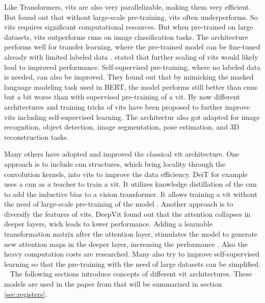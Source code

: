 \documentclass[conference]{IEEEtran}
\begin{document}
  Like Transformers, \acp{vit} are also very parallelizable, making them very efficient. But \citeauthor{visiontransformers2021} \cite{visiontransformers2021} found out that without large-scale pre-training, \acp{vit} often underperforms. So \acp{vit} requires significant computational resources. But when pre-trained on large datasets, \acp{vit} outperforms \acp{cnn} on image classification tasks. The architecture performs well for transfer learning, where the pre-trained model can be fine-tuned already with limited labeled data \cite{visiontransformers2021}. \citeauthor{visiontransformers2021} \cite{visiontransformers2021} stated that further scaling of \acp{vit} would likely lead to improved performance. Self-supervised pre-training, where no labeled data is needed, can also be improved. They found out that by mimicking the masked language modeling task used in BERT, the model performs still better than \acp{cnn} but a bit worse than with supervised pre-training of a \ac{vit}. By now different architectures and training tricks of \acp{vit} have been proposed to further improve \acp{vit} including self-supervised learning. The architectur also got adapted for image recognition, object detection, image segmentation, pose estimation, and 3D reconstruction tasks. \cite{vit-state-challenges}

  Many others have adopted and improved the classical \ac{vit} architecture. One approach is to include \ac{cnn} structures, which bring locality through the convolution kernels, into \acp{vit} to improve the data efficiency. DeiT \cite{deit} for example uses a \ac{cnn} as a teacher to train a \ac{vit}. It utilizes knowledge distillation of the \ac{cnn} to add the inductive bias to a vision transformer. It allows training a \ac{vit} without the need of large-scale pre-training of the model \cite{vit-state-challenges}. Another approach is to diversify the features of \acp{vit}. DeepVit \cite{deepvit} found out that the attention collapses in deeper layers, wich leads to lower performance. Adding a learnable transformation matrix after the attention layer, stimulates the model to generate new attention maps in the deeper layer, increasing the performance \cite{vit-state-challenges}. Also the heavy computation costs are researched. Many also try to improve self-supervised learning so that the pre-training with the need of large datasets can be simplified. \cite{vit-state-challenges}
  
  The following sections introduce concepts of different \ac{vit} architectures. These models are used in the paper from \citeauthor{registers} \cite{registers} that will be summarized in section \ref{sec:registers}.
\end{document}
